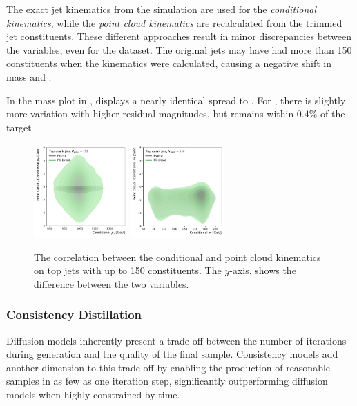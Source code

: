 The exact jet kinematics from the simulation are used for the \textit{conditional kinematics}, while the \textit{point cloud kinematics} are recalculated from the trimmed jet constituents.
These different approaches result in minor discrepancies between the variables, even for the \pythia dataset.
The original jets may have had more than 150 constituents when the kinematics were calculated, causing a negative shift in mass and \pt.

In the mass plot in , \pcdroid displays a nearly identical spread to \pythia.
For \pt, there is slightly more variation with higher residual magnitudes, but \pcdroid remains within $0.4\%$ of the target

\begin{figure}[htpb]
    \centering
    \includegraphics[width=0.32\textwidth]{Figures/jet_generation/droid/150/obedience/t/100/t_pt_PC-Droid_resid.pdf}
    \includegraphics[width=0.32\textwidth]{Figures/jet_generation/droid/150/obedience/t/100/t_mass_PC-Droid_resid.pdf}
    \caption{The correlation between the conditional and point cloud kinematics on top jets with up to 150 constituents. The $y$-axis, shows the difference between the two variables.}
    \label{fig:obedience}
\end{figure}

\subsubsection{Consistency Distillation}

Diffusion models inherently present a trade-off between the number of iterations during generation and the quality of the final sample.
Consistency models add another dimension to this trade-off by enabling the production of reasonable samples in as few as one iteration step, significantly outperforming diffusion models when highly constrained by time.

